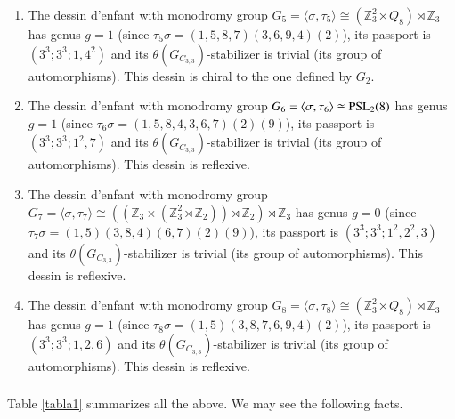 \documentclass[12pt]{amsart}
\theoremstyle{remark}
\begin{document}
\begin{enumerate}
\item The dessin d'enfant with monodromy group $G_{5}=\langle \sigma,\tau_{5}\rangle \cong ({\mathbb Z}_{3}^{2} \rtimes Q_{8}) \rtimes {\mathbb Z}_{3}$ has genus $g=1$ (since $\tau_{5}\sigma=(1,5,8,7)(3,6,9,4)(2)$), its passport is $(3^3;3^3;1,4^2)$ and its 
$\theta(G_{C_{3,3}})$-stabilizer is trivial (its group of automorphisms). This dessin is chiral to the one defined by $G_2$.

\item The dessin d'enfant with monodromy group $G_{6}=\langle \sigma,\tau_{6}\rangle \cong {\rm PSL}_{2}(8)$ has genus  $g=1$ (since $\tau_{6}\sigma=(1,5,8,4,3,6,7)(2)(9)$), its passport is
$(3^3;3^3;1^2,7)$ and its 
$\theta(G_{C_{3,3}})$-stabilizer is trivial (its group of automorphisms). This dessin is reflexive.

\item The dessin d'enfant with monodromy group $G_{7}=\langle \sigma,\tau_{7}\rangle \cong (({\mathbb Z}_{3} \times ({\mathbb Z}_{3}^{2} \rtimes {\mathbb Z}_{2})) \rtimes {\mathbb Z}_{2}) \rtimes {\mathbb Z}_{3}$ has genus $g=0$ (since $\tau_{7}\sigma=(1,5)(3,8,4)(6,7)(2)(9)$), its passport is $(3^3;3^3;1^2,2^2,3)$ and its 
$\theta(G_{C_{3,3}})$-stabilizer is trivial (its group of automorphisms). This dessin is reflexive.

\item The dessin d'enfant with monodromy group $G_{8}=\langle \sigma,\tau_{8}\rangle \cong ({\mathbb Z}_{3}^{2} \rtimes Q_{8}) \rtimes {\mathbb Z}_{3}$ has genus $g=1$ (since $\tau_{8}\sigma=(1,5)(3,8,7,6,9,4)(2)$), its passport is $(3^3;3^3;1,2,6)$ and its
 $\theta(G_{C_{3,3}})$-stabilizer is trivial (its group of automorphisms).  This dessin is reflexive.

\end{enumerate}
  
 
 {\vspace{0.3cm}}
\subsubsection{}
Table \ref{tabla1} summarizes all the above. We may see the following facts.
\end{document}
